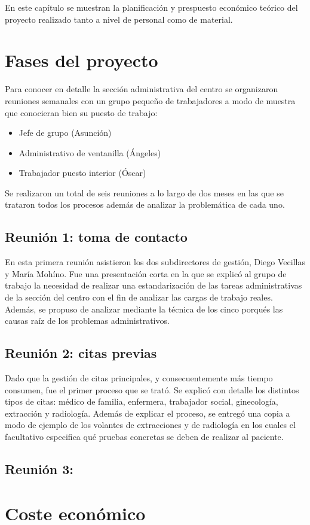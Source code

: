 En este capítulo se muestran la planificación y prespuesto económico teórico del proyecto realizado tanto a nivel de personal como de material.

\section{Fases del proyecto}

Para conocer en detalle la sección administrativa del centro se organizaron reuniones semanales con un grupo pequeño de trabajadores a modo de muestra que conocieran bien su puesto de trabajo:

\begin{itemize}
    \item Jefe de grupo (Asunción)
    \item Administrativo de ventanilla (Ángeles)
    \item Trabajador puesto interior (Óscar)
\end{itemize}

Se realizaron un total de seis reuniones a lo largo de dos meses en las que se trataron todos los procesos además de analizar la problemática de cada uno.

\subsection{Reunión 1: toma de contacto}

En esta primera reunión asistieron los dos subdirectores de gestión, Diego Vecillas y María Mohíno. Fue una presentación corta en la que se explicó al grupo de trabajo la necesidad de realizar una estandarización de las tareas administrativas de la sección del centro con el fin de analizar las cargas de trabajo reales. Además, se propuso de analizar mediante la técnica de los cinco porqués las causas raíz de los problemas administrativos.

\subsection{Reunión 2: citas previas}

Dado que la gestión de citas principales, y consecuentemente más tiempo consumen, fue el primer proceso que se trató. Se explicó con detalle los distintos tipos de citas: médico de familia, enfermera, trabajador social, ginecología, extracción y radiología. Además de explicar el proceso, se entregó una copia a modo de ejemplo de los volantes de extracciones y de radiología en los cuales el facultativo especifica qué pruebas concretas se deben de realizar al paciente.

\subsection{Reunión 3: }

\section{Coste económico}